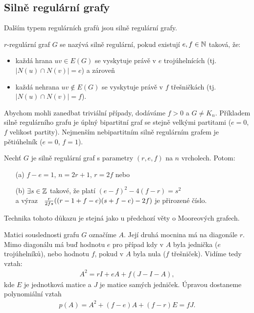 \subsection{Silně regulární grafy}

Dalším typem regulárních grafů jsou silně regulární grafy.

\df $r$-regulární graf $G$ se nazývá silně regulární, pokud existují $e, f \in \mathbb{N}$ taková, že:
\begin{itemize}
	\item každá hrana $uv \in E(G)$ se vyskytuje právě v $e$ trojúhelnících (tj. $|N(u) \cap N(v)| = e$) a zároveň
	\item každá nehrana $uv \not\in E(G)$ se vyskytuje právě v $f$ třešničkách (tj. $|N(u) \cap N(v)| = f$).
\end{itemize}

\pzn Abychom mohli zanedbat triviální případy, dodáváme $f>0$ a $G\neq K_n$.
Příkladem silně regulárního grafu je úplný bipartitní graf se stejně velkými
partitami ($e=0$, $f$ velikost partity). Nejmenším nebipartitním silně regulárním grafem je
pětiúhelník ($e=0$, $f=1$).

\vt Nechť $G$ je silně regulární graf s parametry $(r,e,f)$ na $n$ vrcholech. Potom:
\begin{enumerate}
	\item[(a)] $f-e = 1$, $n = 2r +1$,  $r = 2f$ nebo
	\item[(b)] $\exists s \in \mathbb{Z}$ takové, že platí $(e-f)^2-4(f-r) = s^2$ \\
	a výraz \ ${r\over 2fs}((r-1+f-e)(s+f-e)-2f)$ je přirozené číslo.
\end{enumerate}

\dk
Technika tohoto důkazu je stejná jako u předchozí věty o Mooreových grafech.

Matici souslednosti grafu $G$ označíme $A$. Její druhá mocnina má na diagonále $r$. Mimo diagonálu má buď hodnotu $e$ pro případ kdy v $A$ byla jednička ($e$ trojúhelníků), nebo hodnotu $f$, pokud v $A$ byla nula ($f$ třešniček). Vidíme tedy vztah:
\begin{align}
A^2 = rI + eA + f(J-I-A),
\end{align}
kde $E$ je jednotková matice a $J$ je matice samých jedniček. Úpravou dostaneme polynomiální vztah
\begin{align}
p(A) = A^2 + (f-e)A + (f-r)E = fJ.
\end{align}

